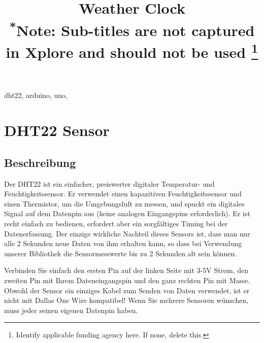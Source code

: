 \documentclass[conference]{IEEEtran}
\begin{document}
\title{Weather Clock\\
{\footnotesize \textsuperscript{*}Note: Sub-titles are not captured in Xplore and
should not be used}
\thanks{Identify applicable funding agency here. If none, delete this.}
}

\author{
\and
{}
}

\maketitle

\begin{abstract}

\end{abstract}

\begin{IEEEkeywords}
dht22, arduino, uno, 
\end{IEEEkeywords}

\section{DHT22 Sensor}

\subsection{Beschreibung}
Der DHT22 ist ein einfacher, preiswerter digitaler Temperatur- und Feuchtigkeitssensor. Er verwendet einen kapazitiven Feuchtigkeitssensor und einen Thermistor, um die Umgebungsluft zu messen, und spuckt ein digitales Signal auf dem Datenpin aus (keine analogen Eingangspins erforderlich). Er ist recht einfach zu bedienen, erfordert aber ein sorgfältiges Timing bei der Datenerfassung. Der einzige wirkliche Nachteil dieses Sensors ist, dass man nur alle 2 Sekunden neue Daten von ihm erhalten kann, so dass bei Verwendung unserer Bibliothek die Sensormesswerte bis zu 2 Sekunden alt sein können.

Verbinden Sie einfach den ersten Pin auf der linken Seite mit 3-5V Strom, den zweiten Pin mit Ihrem Dateneingangspin und den ganz rechten Pin mit Masse. Obwohl der Sensor ein einziges Kabel zum Senden von Daten verwendet, ist er nicht mit Dallas One Wire kompatibel! Wenn Sie mehrere Sensoren wünschen, muss jeder seinen eigenen Datenpin haben.
\end{document}
